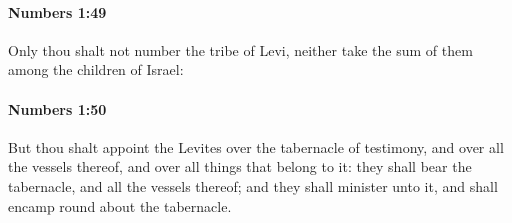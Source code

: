 		\paragraph{Numbers 1:49} %
			\label{NUMBERS-1-49}

			Only thou shalt not number the tribe of Levi, neither take the sum of them among the children of Israel:


		\paragraph{Numbers 1:50} %
			\label{NUMBERS-1-50}

			But thou shalt appoint the Levites over the tabernacle of testimony, and over all the vessels thereof, and over all things that belong to it: they shall bear the tabernacle, and all the vessels thereof; and they shall minister unto it, and shall encamp round about the tabernacle.

